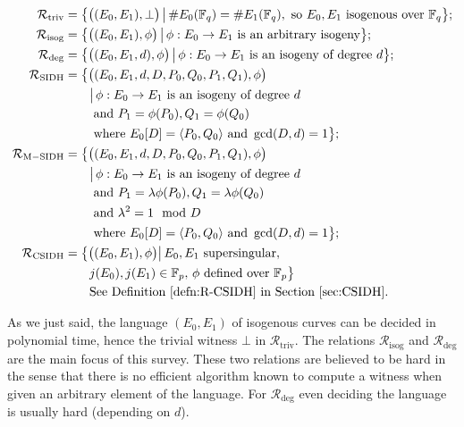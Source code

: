 \documentclass{llncs}
\newcommand{\F}{\ensuremath{\mathbb{F}}}
\newcommand{\R}[1][]{\ensuremath{\mathcal{R}_{\mathrm{#1}}}}
\newcommand{\comment}[1]{{\color{gray}#1}}
\newcommand{\CP}[1]{\comment{Christophe: #1}}
\newcommand{\LDF}[1]{\comment{Luca: #1}}
\begin{document}
\begin{align*}
    \R[triv] &= \bigl\{ \bigl((E_0, E_1), \bot \bigr) \,\big\vert\, \#E_0( \F_q ) = \#E_1(\F_q), \text{ so } E_0, E_1 \text{ isogenous over } \F_q \bigr\};\\
    \R[isog]  &= \bigl\{ \bigl((E_0, E_1),\phi \bigr) \,\big\vert\, \phi : E_0 \to E_1 \text{ is an arbitrary isogeny}\bigr\};\\
    \R[deg]   &= \bigl\{ \bigl((E_0, E_1, d), \phi\bigr) \,\big\vert\, \phi : E_0 \to E_1 \text{ is an isogeny of degree } d \bigr\};\\
    \R[SIDH]  &= \bigl\{ \bigl((E_0, E_1, d, D, P_0, Q_0, P_1, Q_1 ),\phi \bigr) \\
              &\qquad \big\vert\, \phi : E_0 \to E_1 \text{ is an isogeny of degree } d \\
              &\qquad \text{ and } P_1 = \phi(P_0), Q_1 = \phi(Q_0) \\
              &\qquad \text{ where } E_0[D] = \langle P_0, Q_0\rangle  \text{ and } \gcd(D,d) = 1 \bigr\} ;\\
    \R[M-SIDH]&= \bigl\{ \bigl((E_0, E_1, d, D, P_0, Q_0, P_1, Q_1 ),\phi \bigr) \\
              &\qquad \big\vert\, \phi : E_0 \to E_1 \text{ is an isogeny of degree } d \\
              &\qquad \text{ and } P_1 = \lambda\phi(P_0), Q_1 = \lambda\phi(Q_0) \\
              &\qquad \text{ and } \lambda^2 = 1 \mod D \\
              &\qquad \text{ where } E_0[D] = \langle P_0, Q_0\rangle  \text{ and } \gcd(D,d) = 1 \bigr\} ;\\
    \R[CSIDH] &= \bigl\{ \bigl((E_0, E_1 ), \phi \bigr) \big\vert\, E_0,E_1 \text{ supersingular}, \\
              &\qquad  j(E_0), j(E_1) \in \F_p, \, \phi \text{ defined over } \F_p \bigr\} \\ & \qquad \text{See Definition~\ref{defn:R-CSIDH} in Section~\ref{sec:CSIDH}.}
\end{align*}

As we just said, the language $(E_0,E_1)$ of isogenous curves can be decided in polynomial time, hence the trivial witness $\bot$ in \R[triv].
The relations \R[isog] and \R[deg] are the main focus of this survey.
These two relations are believed to be hard in the sense that there is no efficient algorithm known to compute a witness when given an arbitrary element of the language. For $\R[deg]$ even deciding the language is usually hard (depending on $d$).
\end{document}
